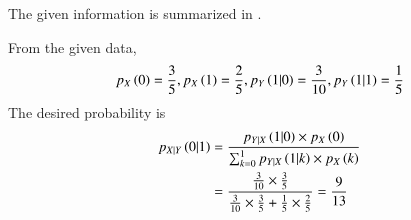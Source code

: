 The given information is summarized in 
.
\begin{table}[H]
\centering

\caption{}
\label{tab:12/13/3/3}
\end{table}
From the given data, 
\begin{align}
	p_{X}\left(0\right) = \frac{3}{5},
	p_{X}\left(1\right) = \frac{2}{5},
	p_{Y}\left(1 | 0\right) = \frac{3}{10},
	p_{Y}\left(1 | 1\right) = \frac{1}{5}
\end{align}
 The desired probability is
 \begin{align}
 p_{X| Y}\left(0| 1\right) &= \frac{p_{Y| X}\left(1 | 0\right)\times p_{X}\left(0\right)}{\sum_{k=0}^{1}p_{Y| X}\left(1 | k\right)\times p_{X}\left(k\right) }\\
 	&= \frac{\frac{3}{10}\times\frac{3}{5}}{\frac{3}{10}\times\frac{3}{5} + \frac{1}{5}\times\frac{2}{5}}
 	= \frac{9}{13}
 \end{align}

